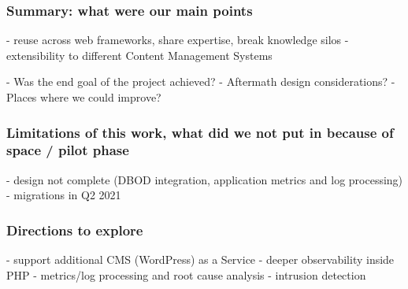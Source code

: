 \subsubsection*{Summary: what were our main points}

- reuse across web frameworks, share expertise, break knowledge silos
- extensibility to different Content Management Systems

- Was the end goal of the project achieved?
- Aftermath design considerations?
- Places where we could improve?

\subsubsection*{Limitations of this work, what did we not put in because of space / pilot phase}

- design not complete (DBOD integration, application metrics and log processing)
- migrations in Q2 2021

\subsubsection*{Directions to explore}

- support additional CMS (WordPress) as a Service
- deeper observability inside PHP
- metrics/log processing and root cause analysis
- intrusion detection